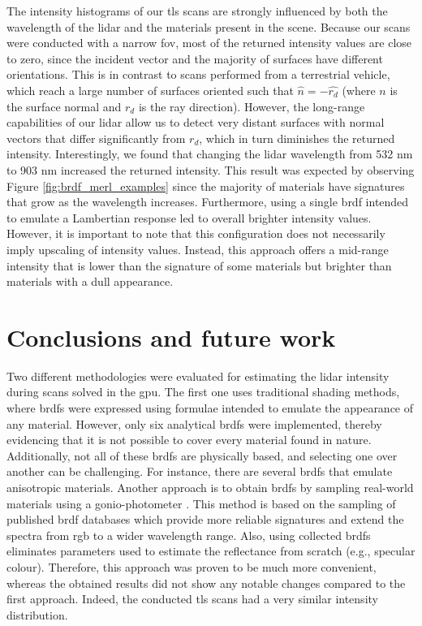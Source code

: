The intensity histograms of our \acrshort{tls} scans are strongly influenced by both the wavelength of the \acrshort{lidar} and the materials present in the scene. Because our scans were conducted with a narrow \acrshort{fov}, most of the returned intensity values are close to zero, since the incident vector and the majority of surfaces have different orientations. This is in contrast to scans performed from a terrestrial vehicle, which reach a large number of surfaces oriented such that $\hat{n} = -\hat{r_d}$ (where $n$ is the surface normal and $r_d$ is the ray direction). However, the long-range capabilities of our \acrshort{lidar} allow us to detect very distant surfaces with normal vectors that differ significantly from $r_d$, which in turn diminishes the returned intensity. Interestingly, we found that changing the \acrshort{lidar} wavelength from 532 \si{\nano\meter} to 903 \si{\nano\meter} increased the returned intensity. This result was expected by observing Figure \ref{fig:brdf_merl_examples} since the majority of materials have signatures that grow as the wavelength increases. Furthermore, using a single \acrshort{brdf} intended to emulate a Lambertian response led to overall brighter intensity values. However, it is important to note that this configuration does not necessarily imply upscaling of intensity values. Instead, this approach offers a mid-range intensity that is lower than the signature of some materials but brighter than materials with a dull appearance.

\section{Conclusions and future work}

Two different methodologies were evaluated for estimating the \acrshort{lidar} intensity during scans solved in the \acrshort{gpu}. The first one uses traditional shading methods, where \acrshort{brdf}s were expressed using formulae intended to emulate the appearance of any material. However, only six analytical \acrshort{brdf}s were implemented, thereby evidencing that it is not possible to cover every material found in nature. Additionally, not all of these \acrshort{brdf}s are physically based, and selecting one over another can be challenging. For instance, there are several \acrshort{brdf}s that emulate anisotropic materials. Another approach is to obtain \acrshort{brdf}s by sampling real-world materials using a gonio-photometer \cite{dupuy_adaptive_2018}. This method is based on the sampling of published \acrshort{brdf} databases which provide more reliable signatures and extend the spectra from \acrshort{rgb} to a wider wavelength range. Also, using collected \acrshort{brdf}s eliminates parameters used to estimate the reflectance from scratch (e.g., specular colour). Therefore, this approach was proven to be much more convenient, whereas the obtained results did not show any notable changes compared to the first approach. Indeed, the conducted \acrshort{tls} scans had a very similar intensity distribution.

